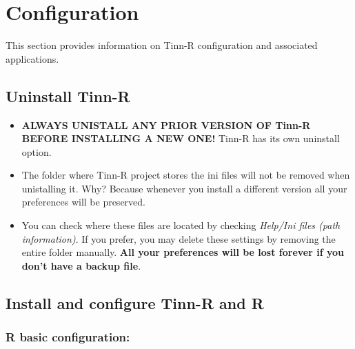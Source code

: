 
\hypertarget{basic_configuration}{}
\section{Configuration}

This section provides information on Tinn-R configuration and associated
applications.


\subsection{Uninstall Tinn-R}

\begin{itemize}
  \item \textbf{ALWAYS UNISTALL ANY PRIOR VERSION OF Tinn-R BEFORE
      INSTALLING A NEW ONE!} Tinn-R has its own uninstall option.
  \item The folder where Tinn-R project stores the ini files will
    not be removed when unistalling it. Why? Because whenever you
    install a different version all your preferences will be
    preserved.
  \item You can check where these files are located by checking
    \textit{Help/Ini files (path information)}. If you prefer,
    you may delete these settings by removing the entire folder manually.
    \textbf{All your preferences will be lost forever if you don't
      have a backup file}.
\end{itemize}


\hypertarget{basic_configuration_installconfigure}{}
\subsection{Install and configure Tinn-R and R}


\subsubsection{R basic configuration:}

